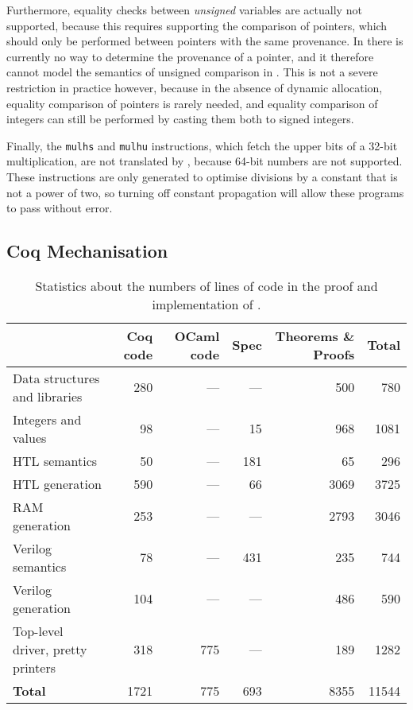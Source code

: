 Furthermore, equality checks between \emph{unsigned} variables are actually not supported, because this requires supporting the comparison of pointers, which should only be performed between pointers with the same provenance.  In \vericert{} there is currently no way to determine the provenance of a pointer, and it therefore cannot model the semantics of unsigned comparison in \compcert{}. This is not a severe restriction in practice however, because in the absence of dynamic allocation, equality comparison of pointers is rarely needed, and equality comparison of integers can still be performed by casting them both to signed integers.

Finally, the \texttt{mulhs} and \texttt{mulhu} instructions, which fetch the
upper bits of a 32-bit multiplication, are not translated by \vericert{},
because 64-bit numbers are not supported. These instructions are only generated
to optimise divisions by a constant that is not a power of two, so turning off
constant propagation will allow these programs to pass without error.

\subsection{Coq Mechanisation}

\begin{table}
  \centering
  \caption{Statistics about the numbers of lines of code in the proof and implementation of \vericert{}.}\label{tab:proof_statistics}
  \begin{tabular}{lrrrrr}
    \toprule
    & \textbf{Coq code} & \multicolumn{1}{p{1cm}}{\raggedleft\textbf{OCaml code}} & \textbf{Spec} & \multicolumn{1}{p{2cm}}{\raggedleft\textbf{Theorems \& Proofs}} & \textbf{Total}\\
    \midrule
    {Data structures and libraries}     & 280  & --- & ---  & 500  & 780   \\
    {Integers and values}               & 98   & --- & 15   & 968  & 1081  \\
    {HTL semantics}                     & 50   & --- & 181  & 65   & 296   \\
    {HTL generation}                    & 590  & --- & 66   & 3069 & 3725  \\
    {RAM generation}                    & 253  & --- & ---  & 2793 & 3046  \\
    {Verilog semantics}                 & 78   & --- & 431  & 235  & 744   \\
    {Verilog generation}                & 104  & --- & ---  & 486  & 590   \\
    {Top-level driver, pretty printers} & 318  & 775 & ---  & 189  & 1282  \\
    \midrule
    \textbf{Total}                      & 1721 & 775 & 693  & 8355 & 11544 \\
    \bottomrule
  \end{tabular}
\end{table}

